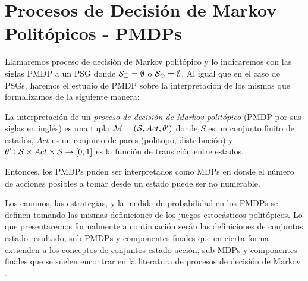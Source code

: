 \section{Procesos de Decisión de Markov Politópicos - PMDPs}
\label{sec:pmdp}

Llamaremos proceso de decisión de Markov politópico y lo indicaremos con las
siglas PMDP a un PSG donde $\mathcal{S}_\square = \emptyset$ o $\mathcal{S}_\diamondsuit = \emptyset$.
Al igual que en el caso de PSGs, haremos el estudio de PMDP sobre la
interpretación de los mismos que formalizamos de la siguiente manera:

\begin{definition}
	La interpretación de un \textit{proceso de decisión de Markov politópico} (PMDP por sus siglas en inglés) es una tupla $\mathcal{M} = (\mathcal{S}, Act, \theta')$ donde $S$ es un conjunto finito de estados, $Act$ es un conjunto de pares (politopo, distribución) y $\theta': \mathcal{S} \times Act \times \mathcal{S} \rightarrow [0, 1]$ es la función de transición entre estados.
\end{definition}

Entonces, los PMDPs puden ser interpretados como MDPs en donde el número de
acciones posibles a tomar desde un estado puede ser no numerable.


Los caminos, las estrategias, y la medida de probabilidad en los PMDPs se
definen tomando las mismas definiciones de los juegos estocásticos politópicos.
Lo que presentaremos formalmente a continuación serán las definiciones de
conjuntos estado-resultado, sub-PMDPs y componentes finales que en cierta forma
extienden a los conceptos de conjuntos estado-acción, sub-MDPs y componentes
finales que se suelen encontrar en la literatura de procesos de decisión de
Markov \cite{AlfaroThesis,BaierKatoen}.

